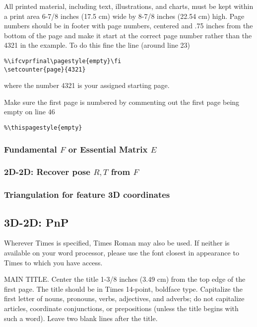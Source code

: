 \documentclass[10pt,twocolumn,letterpaper]{article}
\begin{document}
All printed material, including text, illustrations, and charts, must be kept
within a print area 6-7/8 inches (17.5 cm) wide by 8-7/8 inches (22.54 cm)
high.
Page numbers should be in footer with page numbers, centered and .75
inches from the bottom of the page and make it start at the correct page
number rather than the 4321 in the example.  To do this fine the line (around
line 23)
\begin{verbatim}
%\ifcvprfinal\pagestyle{empty}\fi
\setcounter{page}{4321}
\end{verbatim}
where the number 4321 is your assigned starting page.

Make sure the first page is numbered by commenting out the first page being
empty on line 46
\begin{verbatim}
%\thispagestyle{empty}
\end{verbatim}

\subsubsection{Fundamental $F$ or Essential Matrix $E$}

\subsubsection{2D-2D: Recover pose $R, T$ from $F$}

\subsubsection{Triangulation for feature 3D coordinates}

\subsection{3D-2D: PnP}

Wherever Times is specified, Times Roman may also be used. If neither is
available on your word processor, please use the font closest in
appearance to Times to which you have access.

MAIN TITLE. Center the title 1-3/8 inches (3.49 cm) from the top edge of
the first page. The title should be in Times 14-point, boldface type.
Capitalize the first letter of nouns, pronouns, verbs, adjectives, and
adverbs; do not capitalize articles, coordinate conjunctions, or
prepositions (unless the title begins with such a word). Leave two blank
lines after the title.
\end{document}
